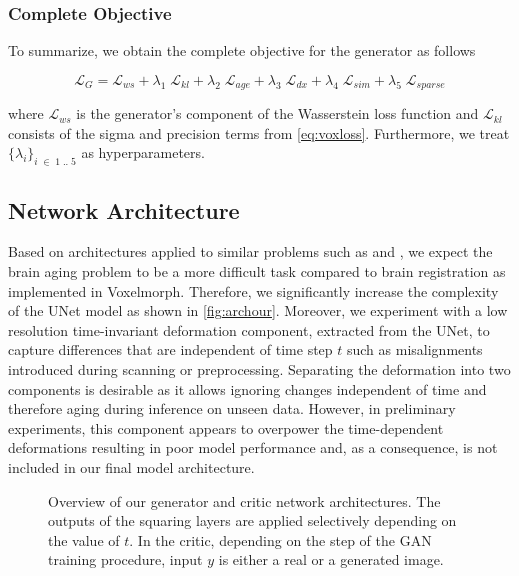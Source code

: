 \subsubsection*{Complete Objective}
To summarize, we obtain the complete objective for the generator as follows

\begin{equation}
	\mathcal{L}_G =
		\mathcal{L}_{ws} +
		\lambda_{1} \; \mathcal{L}_{kl} +
		\lambda_{2} \; \mathcal{L}_{age} + 
		\lambda_{3} \; \mathcal{L}_{dx} + 
		\lambda_{4} \; \mathcal{L}_{sim} + 
		\lambda_{5} \; \mathcal{L}_{sparse}
\end{equation}

where $\mathcal{L}_{ws}$ is the generator's component of the Wasserstein loss function and $\mathcal{L}_{kl}$ consists of the sigma and precision terms from \autoref{eq:voxloss}. Furthermore, we treat $ \{ \lambda_i \}_{i\;\in\;1\;..\;5}$ as hyperparameters.

\subsection{Network Architecture}
Based on architectures applied to similar problems such as \cite{wegmayr} and \cite{baumgartner2018visual}, we expect the brain aging problem to be a more difficult task compared to brain registration as implemented in Voxelmorph. Therefore, we significantly increase the complexity of the UNet model as shown in \autoref{fig:archour}.
Moreover, we experiment with a low resolution time-invariant deformation component, extracted from the UNet, to capture differences that are independent of time step $t$ such as misalignments introduced during scanning or preprocessing. Separating the deformation into two components is desirable as it allows ignoring changes independent of time and therefore aging during inference on unseen data.
However, in preliminary experiments, this component appears to overpower the time-dependent deformations resulting in poor model performance and, as a consequence, is not included in our final model architecture.

\begin{figure}
	\centering
	
	\caption{Overview of our generator and critic network architectures. The outputs of the squaring layers are applied selectively depending on the value of $t$. In the critic, depending on the step of the GAN training procedure, input $y$ is either a real or a generated image.}
	\label{fig:archour}
\end{figure}

